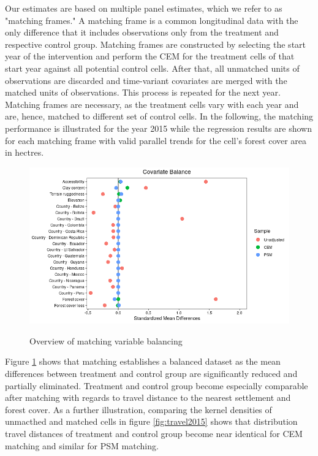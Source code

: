 \documentclass{article}
\begin{document}
Our estimates are based on multiple panel estimates, which we refer to as "matching frames." A matching frame is a common longitudinal data with the only difference that it includes observations only from the treatment and respective control group. Matching frames are constructed by selecting the start year of the intervention and perform the CEM for the treatment cells of that start year against all potential control cells. After that, all unmatched units of observations are discarded and time-variant covariates are merged with the matched units of observations. This process is repeated for the next year. Matching frames are necessary, as the treatment cells vary with each year and are, hence, matched to different set of control cells. In the following, the matching performance is illustrated for the year 2015 while the regression results are shown for each matching frame with valid parallel trends for the cell's forest cover area in hectres.

\begin{figure}[H]
\centering
\caption{Overview of matching variable balancing}
\includegraphics[width=\linewidth]{"figures/matching frame 2015-1"}
\label{fig:balance2015}
\end{figure}

Figure \ref{fig:balance2015} shows that matching establishes a balanced dataset as the mean differences between treatment and control group are significantly reduced and partially eliminated. Treatment and control group become especially comparable after matching with regards to travel distance to the nearest settlement and forest cover. As a further illustration, comparing the kernel densities of unmacthed and matched cells in figure \ref{fig:travel2015} shows that distribution travel distances of treatment and control group become near identical for CEM matching and similar for PSM matching.
\end{document}
